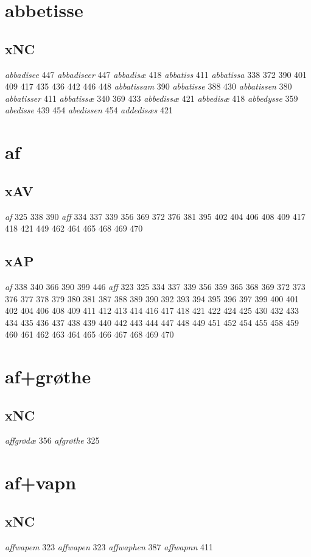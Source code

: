 \documentclass[a4paper,twocolumn]{article}
\begin{document}
\section{abbetisse}
\label{sec:orgc71dd5c}
\subsection{xNC}
\label{sec:org02223f3}
\emph{abbadisee} 447 \emph{abbadiseer} 447 \emph{abbadisæ} 418 \emph{abbatiss} 411 \emph{abbatissa} 338 372 390 401 409 417 435 436 442 446 448 \emph{abbatissam} 390 \emph{abbatisse} 388 430 \emph{abbatissen} 380 \emph{abbatisser} 411 \emph{abbatissæ} 340 369 433 \emph{abbedissæ} 421 \emph{abbedisæ} 418 \emph{abbedysse} 359 \emph{abedisse} 439 454 \emph{abedissen} 454 \emph{addedisæs} 421 
\section{af}
\label{sec:org27c8f68}
\subsection{xAV}
\label{sec:org244db62}
\emph{af} 325 338 390 \emph{aff} 334 337 339 356 369 372 376 381 395 402 404 406 408 409 417 418 421 449 462 464 465 468 469 470 
\subsection{xAP}
\label{sec:orgd808c60}
\emph{af} 338 340 366 390 399 446 \emph{aff} 323 325 334 337 339 356 359 365 368 369 372 373 376 377 378 379 380 381 387 388 389 390 392 393 394 395 396 397 399 400 401 402 404 406 408 409 411 412 413 414 416 417 418 421 422 424 425 430 432 433 434 435 436 437 438 439 440 442 443 444 447 448 449 451 452 454 455 458 459 460 461 462 463 464 465 466 467 468 469 470 
\section{af+grøthe}
\label{sec:org1453461}
\subsection{xNC}
\label{sec:orgd54034a}
\emph{affgrødæ} 356 \emph{afgrøthe} 325 
\section{af+vapn}
\label{sec:orga881502}
\subsection{xNC}
\label{sec:orgf663f87}
\emph{affwapem} 323 \emph{affwapen} 323 \emph{affwaphen} 387 \emph{affwapnn} 411 
\end{document}
